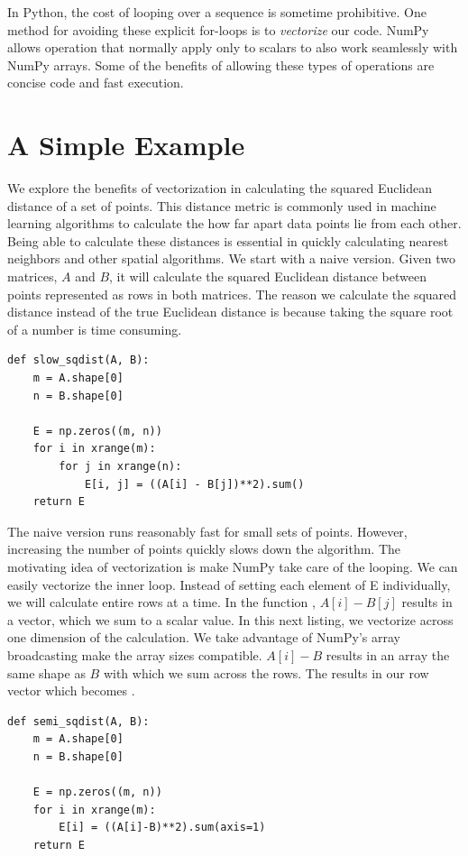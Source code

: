 \label{lab:Python_Vectorization}

In Python, the cost of looping over a sequence is sometime prohibitive.
One method for avoiding these explicit for-loops is to \emph{vectorize} our code.
NumPy allows operation that normally apply only to scalars to also work seamlessly with NumPy arrays.
Some of the benefits of allowing these types of operations are concise code and fast execution.

\section*{A Simple Example}
We explore the benefits of vectorization in calculating the squared Euclidean distance of a set of points.
This distance metric is commonly used in machine learning algorithms to calculate the how far apart data points lie from each other.
Being able to calculate these distances is essential in quickly calculating nearest neighbors and other spatial algorithms.
We start with a naive version.  Given two matrices, $A$ and $B$, it will calculate the squared Euclidean distance between points
represented as rows in both matrices.  The reason we calculate the squared distance instead of the true Euclidean distance is because
taking the square root of a number is time consuming.
\begin{lstlisting}
def slow_sqdist(A, B):
    m = A.shape[0]
    n = B.shape[0]
    
    E = np.zeros((m, n))
    for i in xrange(m):
        for j in xrange(n):
            E[i, j] = ((A[i] - B[j])**2).sum()
    return E
\end{lstlisting}
The naive version runs reasonably fast for small sets of points.  However, increasing the number of points quickly slows down the algorithm.
The motivating idea of vectorization is make NumPy take care of the looping.  
We can easily vectorize the inner loop.  Instead of setting each element of E individually, we will calculate entire rows at a time.
In the function , $A[i]-B[j]$ results in a vector, which we sum to a scalar value.
In this next listing, we vectorize across one dimension of the calculation.
We take advantage of NumPy's array broadcasting make the array sizes compatible.
$A[i]-B$ results in an array the same shape as $B$ with which we sum across the rows.  The results in our row vector which becomes .
\begin{lstlisting}
def semi_sqdist(A, B):
    m = A.shape[0]
    n = B.shape[0]

    E = np.zeros((m, n))
    for i in xrange(m):
        E[i] = ((A[i]-B)**2).sum(axis=1)
    return E
\end{lstlisting}
